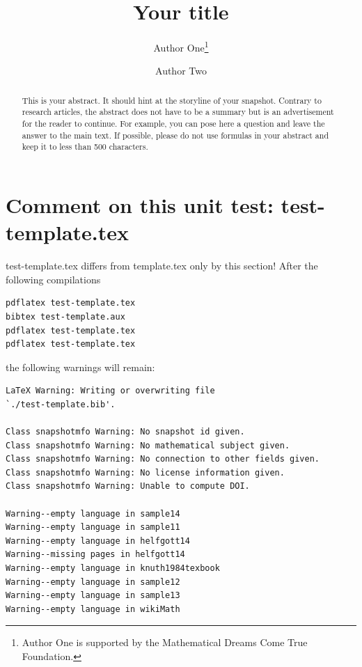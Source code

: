 \documentclass{snapshotmfo}
\author{Author One\thanks{Author One is supported by the Mathematical Dreams Come True Foundation.} \and Author Two}
\title{Your title}
\begin{document}

\begin{abstract}
This is your abstract. It should hint at the storyline of your snapshot. Contrary to research articles, the abstract does not have to be a summary but is an advertisement for the reader to continue. For example, you can pose here a question and leave the answer to the main text. If possible, please do not use formulas in your abstract and keep it to less than 500 characters.
\end{abstract}

\section{Comment on this unit test: test-template.tex}
test-template.tex differs from template.tex only by this section!
After the following compilations
\begin{verbatim}
pdflatex test-template.tex
bibtex test-template.aux
pdflatex test-template.tex
pdflatex test-template.tex
\end{verbatim}
the following warnings will remain:
\begin{verbatim}
LaTeX Warning: Writing or overwriting file
`./test-template.bib'.

Class snapshotmfo Warning: No snapshot id given.
Class snapshotmfo Warning: No mathematical subject given.
Class snapshotmfo Warning: No connection to other fields given.
Class snapshotmfo Warning: No license information given.
Class snapshotmfo Warning: Unable to compute DOI.

Warning--empty language in sample14
Warning--empty language in sample11
Warning--empty language in helfgott14
Warning--missing pages in helfgott14
Warning--empty language in knuth1984texbook
Warning--empty language in sample12
Warning--empty language in sample13
Warning--empty language in wikiMath
\end{verbatim}
\end{document}
